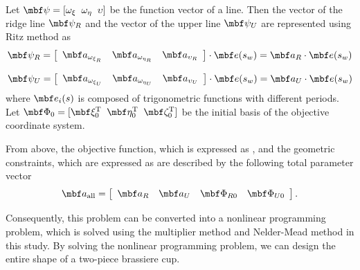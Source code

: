 \documentclass[E]{scitrans}
\begin{document}
Let $ \mbold{\psi} = [\omega_{\xi} \;\; \omega_{\eta} \;\; \upsilon] $ be the function vector of a line. Then the vector of the ridge line $ \mbold{\psi}_R $ and the vector of the upper line $ \mbold{\psi}_U $ are represented using Ritz method\cite{c13} as
\begin{equation}\label{eq:R_eq}
\mbold{\psi}_R = \left[ \begin{array}{ccc} \mbold{a}_{\omega_{\xi_R}}& \mbold{a}_{\omega_{\eta_R}}& \mbold{a}_{\upsilon_R} \end{array} \right] \cdot \mbold{e}(s_w) = \mbold{a}_R \cdot \mbold{e}(s_w) 
\end{equation}

\begin{equation}\label{eq:U_eq}
\mbold{\psi}_U = \left[ \begin{array}{ccc} \mbold{a}_{\omega_{\xi_U}}& \mbold{a}_{\omega_{\eta_U}}& \mbold{a}_{\upsilon_U} \end{array} \right] \cdot  \mbold{e}(s_w) = \mbold{a}_U \cdot \mbold{e}(s_w)
\end{equation}
where $ \mbold{e}_i(s) $ is composed of trigonometric functions with different periods. Let $ \mbold{\Phi}_0 = [\xivec_0^\mathrm{T} \;\; \etavec_0^\mathrm{T} \;\; \zetavec_0^\mathrm{T}] $ be the initial basis of the objective coordinate system.

From above, the objective function, which is expressed as , and the geometric constraints, which are expressed as   are described by the following total parameter vector 
\begin{equation}\label{eq:TotalCoefs}
\mbold{a}_{\mathrm{all}} = \left[ \begin{array}{cccc}
\mbold{a}_R & \mbold{a}_U & \mbold{\Phi}_{R0} &\mbold{\Phi}_{U0} 
\end{array}\right].
\end{equation}

Consequently, this problem can be converted into a nonlinear programming problem, which is solved using the multiplier method and Nelder-Mead method in this study. By solving the nonlinear programming problem, we can design the entire shape of a two-piece brassiere cup. 
\end{document}
